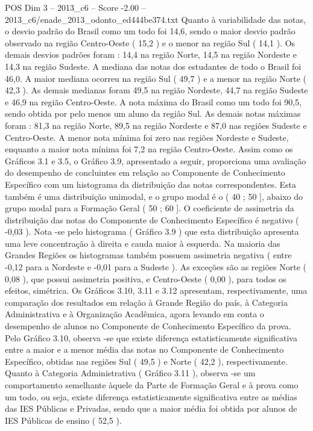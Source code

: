 \begin{textsample}{POS Dim 3 – 2013\_c6 – Score -2.00 – 2013\_c6/enade\_2013\_odonto\_ed444be374.txt}
Quanto à variabilidade das notas, o desvio padrão do Brasil como um todo foi 14,6, sendo o maior desvio padrão observado na região Centro-Oeste ( 15,2 ) e o menor na região Sul ( 14,1 ).
Os demais desvios padrões foram : 14,4 na região Norte, 14,5 na região Nordeste e 14,3 na região Sudeste.
A mediana das notas dos estudantes de todo o Brasil foi 46,0.
A maior mediana ocorreu na região Sul ( 49,7 ) e a menor na região Norte ( 42,3 ).
As demais medianas foram 49,5 na região Nordeste, 44,7 na região Sudeste e 46,9 na região Centro-Oeste.
A nota máxima do Brasil como um todo foi 90,5, sendo obtida por pelo menos um aluno da região Sul.
As demais notas máximas foram : 81,3 na região Norte, 89,5 na região Nordeste e 87,0 nas regiões Sudeste e Centro-Oeste.
A menor nota mínima foi zero nas regiões Nordeste e Sudeste, enquanto a maior nota mínima foi 7,2 na região Centro-Oeste.
Assim como os Gráficos 3.1 e 3.5, o Gráfico 3.9, apresentado a seguir, proporciona uma avaliação do desempenho de concluintes em relação ao Componente de Conhecimento Específico com um histograma da distribuição das notas correspondentes.
Esta também é uma distribuição unimodal, e o grupo modal é o ( 40 ; 50 ], abaixo do grupo modal para a Formação Geral ( 50 ; 60 ].
O coeficiente de assimetria da distribuição das notas do Componente de Conhecimento Específico é negativo ( -0,03 ).
Nota -se pelo histograma ( Gráfico 3.9 ) que esta distribuição apresenta uma leve concentração à direita e cauda maior à esquerda.
Na maioria das Grandes Regiões os histogramas também possuem assimetria negativa ( entre -0,12 para a Nordeste e -0,01 para a Sudeste ).
As exceções são as regiões Norte ( 0,08 ), que possui assimetria positiva, e Centro-Oeste ( 0,00 ), para todos os efeitos, simétrica.
Os Gráficos 3.10, 3.11 e 3.12 apresentam, respectivamente, uma comparação dos resultados em relação à Grande Região do país, à Categoria Administrativa e à Organização Acadêmica, agora levando em conta o desempenho de alunos no Componente de Conhecimento Específico da prova.
Pelo Gráfico 3.10, observa -se que existe diferença estatisticamente significativa entre a maior e a menor média das notas no Componente de Conhecimento Específico, obtidas nas regiões Sul ( 49,5 ) e Norte ( 42,2 ), respectivamente.
Quanto à Categoria Administrativa ( Gráfico 3.11 ), observa -se um comportamento semelhante àquele da Parte de Formação Geral e à prova como um todo, ou seja, existe diferença estatisticamente significativa entre as médias das IES Públicas e Privadas, sendo que a maior média foi obtida por alunos de IES Públicas de ensino ( 52,5 ).

\end{textsample}
